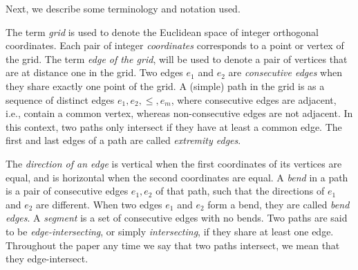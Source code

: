 \documentclass[
submission
]{dmtcs-episciences}
\begin{document}
 Next, we describe some terminology and notation used.


The term \emph{grid} is used to denote the Euclidean space of integer orthogonal coordinates. Each pair of integer \emph{coordinates} corresponds to a point or vertex of the grid. The term \emph{edge of the grid}, will be used to denote a pair of vertices that are at distance one in the grid. Two edges $e_1$ and $e_2$ are \emph{consecutive edges} when they share exactly one point of the grid. %
 A (simple) path in the grid is as a sequence of distinct  edges $e_1, e_2, \leq, e_m$,  where consecutive edges are adjacent, i.e., contain a common vertex, whereas non-consecutive edges are not adjacent.  In this context, two paths only intersect if they have at least a common edge. The first and last edges of a path are called \emph{extremity edges}.
 
 
 
 
 
 
 
 
 
 
 
The \emph{direction of an edge} is vertical when the first coordinates of its vertices  are equal, and is horizontal when the second coordinates are equal. A \emph {bend} in a path is a pair of consecutive edges $ e_1, e_2 $ of that path, such that the directions of $ e_1$ and $ e_2$ are different. When two edges $ e_1$ and $e_2 $ form a bend, they are called \emph { bend edges}. A \emph {segment} is a set of consecutive edges with no bends. %
 Two paths are said to be \emph{edge-intersecting}, or  simply  \emph{intersecting}, if they share at least one edge. %
 Throughout the paper any time we say that two paths intersect, we mean that they edge-intersect.  %
\end{document}
